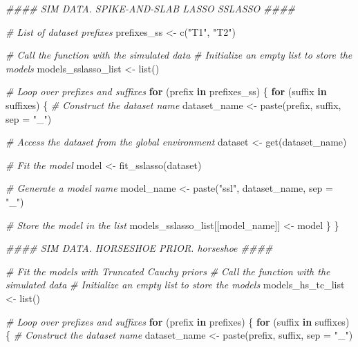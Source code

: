 \documentclass[
  11pt,
]{article}
\newenvironment{Shaded}{}{}
\newcommand{\AttributeTok}[1]{\textcolor[rgb]{0.49,0.56,0.16}{#1}}
\newcommand{\CommentTok}[1]{\textcolor[rgb]{0.38,0.63,0.69}{\textit{#1}}}
\newcommand{\ControlFlowTok}[1]{\textcolor[rgb]{0.00,0.44,0.13}{\textbf{#1}}}
\newcommand{\DocumentationTok}[1]{\textcolor[rgb]{0.73,0.13,0.13}{\textit{#1}}}
\newcommand{\FunctionTok}[1]{\textcolor[rgb]{0.02,0.16,0.49}{#1}}
\newcommand{\NormalTok}[1]{#1}
\newcommand{\OtherTok}[1]{\textcolor[rgb]{0.00,0.44,0.13}{#1}}
\newcommand{\StringTok}[1]{\textcolor[rgb]{0.25,0.44,0.63}{#1}}
\begin{document}
\begin{Shaded}
\begin{Highlighting}[]
\DocumentationTok{\#\#\#\# SIM DATA. SPIKE{-}AND{-}SLAB LASSO \textquotesingle{}SSLASSO\textquotesingle{} \#\#\#\#}

\CommentTok{\# List of dataset prefixes}
\NormalTok{prefixes\_ss }\OtherTok{\textless{}{-}} \FunctionTok{c}\NormalTok{(}\StringTok{"T1"}\NormalTok{, }\StringTok{"T2"}\NormalTok{)}

\CommentTok{\# Call the function with the simulated data}
\CommentTok{\# Initialize an empty list to store the models}
\NormalTok{models\_sslasso\_list }\OtherTok{\textless{}{-}} \FunctionTok{list}\NormalTok{()}

\CommentTok{\#   Loop over prefixes and suffixes}
\ControlFlowTok{for}\NormalTok{ (prefix }\ControlFlowTok{in}\NormalTok{ prefixes\_ss) \{}
  \ControlFlowTok{for}\NormalTok{ (suffix }\ControlFlowTok{in}\NormalTok{ suffixes) \{}
    \CommentTok{\# Construct the dataset name}
\NormalTok{    dataset\_name }\OtherTok{\textless{}{-}} \FunctionTok{paste}\NormalTok{(prefix, suffix, }\AttributeTok{sep =} \StringTok{"\_"}\NormalTok{)}
    
    \CommentTok{\# Access the dataset from the global environment}
\NormalTok{    dataset }\OtherTok{\textless{}{-}} \FunctionTok{get}\NormalTok{(dataset\_name)}
    
    \CommentTok{\# Fit the model}
\NormalTok{    model }\OtherTok{\textless{}{-}} \FunctionTok{fit\_sslasso}\NormalTok{(dataset)}
    
    \CommentTok{\# Generate a model name}
\NormalTok{    model\_name }\OtherTok{\textless{}{-}} \FunctionTok{paste}\NormalTok{(}\StringTok{"ssl"}\NormalTok{, dataset\_name, }\AttributeTok{sep =} \StringTok{"\_"}\NormalTok{)}
    
    \CommentTok{\# Store the model in the list}
\NormalTok{    models\_sslasso\_list[[model\_name]] }\OtherTok{\textless{}{-}}\NormalTok{ model}
\NormalTok{  \}}
\NormalTok{\}}

\DocumentationTok{\#\#\#\# SIM DATA. HORSESHOE PRIOR. \textquotesingle{}horseshoe\textquotesingle{} \#\#\#\#}

\CommentTok{\# Fit the models with Truncated Cauchy priors}
\CommentTok{\# Call the function with the simulated data}
\CommentTok{\# Initialize an empty list to store the models}
\NormalTok{models\_hs\_tc\_list }\OtherTok{\textless{}{-}} \FunctionTok{list}\NormalTok{()}

\CommentTok{\#   Loop over prefixes and suffixes}
\ControlFlowTok{for}\NormalTok{ (prefix }\ControlFlowTok{in}\NormalTok{ prefixes) \{}
  \ControlFlowTok{for}\NormalTok{ (suffix }\ControlFlowTok{in}\NormalTok{ suffixes) \{}
    \CommentTok{\# Construct the dataset name}
\NormalTok{    dataset\_name }\OtherTok{\textless{}{-}} \FunctionTok{paste}\NormalTok{(prefix, suffix, }\AttributeTok{sep =} \StringTok{"\_"}\NormalTok{)}
    

\end{Highlighting}
\end{Shaded}
\end{document}
